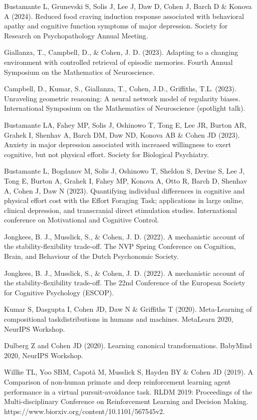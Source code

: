 \documentclass[10 pt]{article}
\begin{document}
Bustamante L, Grunevski S, Solis J, Lee J, Daw D, Cohen J, Barch D \& Konova A (2024). Reduced food craving induction response associated with behavioral apathy and cognitive function symptoms of major depression. Society for Research on Psychopathology Annual Meeting.

Giallanza, T., Campbell, D., \& Cohen, J. D. (2023). Adapting to a changing environment with controlled retrieval of episodic memories. Fourth Annual Symposium on the Mathematics of Neuroscience.

Campbell, D., Kumar, S., Giallanza, T., Cohen, J.D., Griffiths, T.L. (2023). Unraveling geometric reasoning: A neural network model of regularity biases. International Symposium on the Mathematics of Neuroscience (spotlight talk).

Bustamante LA, Fahey MP, Solis J, Oshinowo T, Tong E, Lee JR, Burton AR, Grahek I, Shenhav A, Barch DM, Daw ND, Konova AB \& Cohen JD (2023). Anxiety in major depression associated with increased willingness to exert cognitive, but not physical effort. Society for Biological Psychiatry.

Bustamante L, Bogdanov M, Solis J, Oshinowo T, Sheldon S, Devine S, Lee J, Tong E, Burton A, Grahek I, Fahey MP, Konova A, Otto R, Barch D, Shenhav A, Cohen J, Daw N (2023). Quantifying individual differences in cognitive and physical effort cost with the Effort Foraging Task; applications in large online, clinical depression, and transcranial direct stimulation studies. International conference on Motivational and Cognitive Control.

Jongkees, B. J., Musslick, S., \& Cohen, J. D. (2022). A mechanistic account of the stability-flexibility trade-off. The NVP Spring Conference on Cognition, Brain, and Behaviour of the Dutch Psychonomic Society.

Jongkees, B. J., Musslick, S., \& Cohen, J. D. (2022). A mechanistic account of the stability-flexibility trade-off. The 22nd Conference of the European Society for Cognitive Psychology (ESCOP).

Kumar S, Dasgupta I, Cohen JD, Daw N \& Griffiths T (2020). Meta-Learning of compositional taskdistributions in humans and machines. MetaLearn 2020, NeurIPS Workshop.

Dulberg Z and Cohen JD (2020). Learning canonical transformations. BabyMind 2020, NeurIPS Workshop.

Willke TL, Yoo SBM, Capotă M, Musslick S, Hayden BY \& Cohen JD (2019). A Comparison of non-human primate and deep reinforcement learning agent performance in a virtual pursuit-avoidance task. RLDM 2019: Proceedings of the Multi-disciplinary Conference on Reinforcement Learning and Decision Making. https://www.biorxiv.org/content/10.1101/567545v2.
\end{document}

